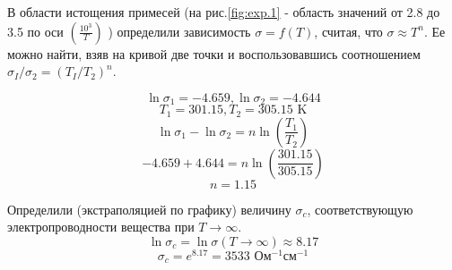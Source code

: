 В области истощения примесей (на рис.\ref{fig:exp.1} - область значений от 2.8 до 3.5 по оси $(\frac{10^3}{T})$ )
определили зависимость $\sigma = f(T)$, считая, что $\sigma \approx T^n$. Ее можно найти, взяв на кривой две точки и
воспользовавшись соотношением $\sigma_{I} / \sigma_{2}=\left(T_{I} / T_{2}\right)^{n}$.

$$\ln \sigma_1 = -4.659, \ln \sigma_2 = -4.644$$
$$ T_1 = 301.15,T_2 = 305.15 \text{ K} $$
$$ \ln \sigma_1 - \ln \sigma_2 = n \ln(\frac{T_1}{T_2})$$
$$ -4.659+4.644 = n \ln(\frac{301.15}{305.15}) $$
$$ n = 1.15 $$

Определили (экстраполяцией по графику) величину $\sigma_c$, соответствующую
электропроводности вещества при $T \to \infty$.
$$ \ln \sigma_c = \ln \sigma (T \to \infty) \approx 8.17$$
$$\sigma_c = e^{8.17}  = 3533\text{ Ом$^{-1}$см$^{-1}$}$$



